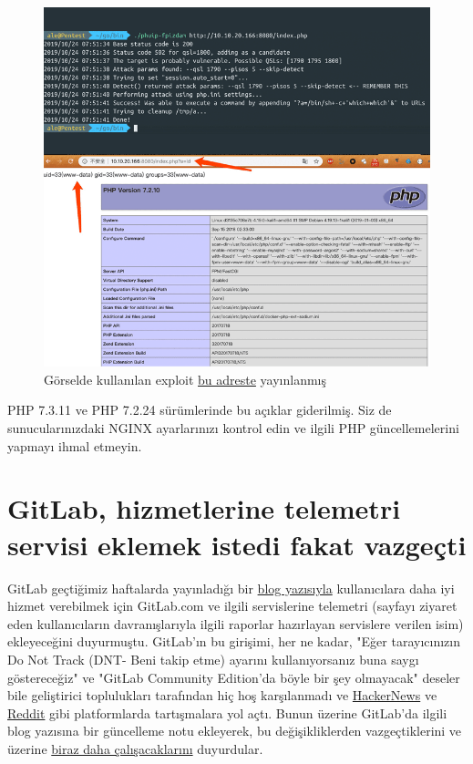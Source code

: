 \documentclass[11pt]{article}
\begin{document}
\begin{figure}[htbp]
\centering
\includegraphics[width=.9\linewidth]{gorseller/php-fpm-acik.png}
\caption{Görselde kullanılan exploit \href{https://github.com/neex/phuip-fpizdam}{bu adreste} yayınlanmış}
\end{figure}

PHP 7.3.11 ve PHP 7.2.24 sürümlerinde bu açıklar giderilmiş. Siz de
sunucularınızdaki NGINX ayarlarınızı kontrol edin ve ilgili PHP
güncellemelerini yapmayı ihmal etmeyin.
\newpage
\section{GitLab, hizmetlerine telemetri servisi eklemek istedi fakat vazgeçti}
\label{sec:orge6d20a4}
GitLab geçtiğimiz haftalarda yayınladığı bir \href{https://about.gitlab.com/blog/2019/10/10/update-free-software-and-telemetry/}{blog yazısıyla} kullanıcılara daha
iyi hizmet verebilmek için GitLab.com ve ilgili servislerine telemetri (sayfayı
ziyaret eden kullanıcıların davranışlarıyla ilgili raporlar hazırlayan
servislere verilen isim) ekleyeceğini duyurmuştu. GitLab'ın bu girişimi, her ne
kadar, "Eğer tarayıcınızın Do Not Track (DNT- Beni takip etme) ayarını
kullanıyorsanız buna saygı göstereceğiz" ve "GitLab Community Edition'da böyle
bir şey olmayacak" deseler bile geliştirici toplulukları tarafından hiç hoş
karşılanmadı ve \href{https://news.ycombinator.com/item?id=21343761}{HackerNews} ve \href{https://www.reddit.com/r/programming/comments/dm72oa/gitlab\_mandating\_thirdparty\_telemetry\_locks\_out}{Reddit} gibi platformlarda tartışmalara yol açtı.
Bunun üzerine GitLab'da ilgili blog yazısına bir güncelleme notu ekleyerek, bu
değişikliklerden vazgeçtiklerini ve üzerine \href{https://gitlab.com/gitlab-com/www-gitlab-com/issues/5672}{biraz daha çalışacaklarını}
duyurdular.
\end{document}
